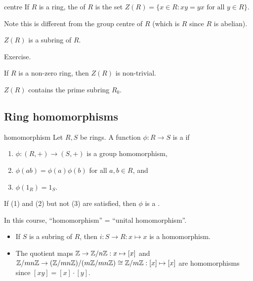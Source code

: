 \documentclass[12pt,letterpaper]{report}
\begin{document}
\begin{defn}{centre}{}
  If $R$ is a ring, the  of $R$ is the set
  $Z(R) = \{x \in R : xy = yx \text{ for all } y \in R\}$.
\end{defn}

Note this is different from the group centre of $R$ (which is $R$ since $R$ is abelian).

\begin{lem}{}{}
  $Z(R)$ is a subring of $R$.
\end{lem}

\begin{thmproof}
  Exercise.
\end{thmproof}

\begin{cor}{}{}
  If $R$ is a non-zero ring, then $Z(R)$ is non-trivial.
\end{cor}

\begin{thmproof}
  $Z(R)$ contains the prime subring $R_0$.
\end{thmproof}

\pagebreak
\subsection{Ring homomorphisms}

\begin{defn}{homomorphism}{}
  Let $R, S$ be rings.
  A function $\phi \colon R \to S$ is a  if
  \begin{enumerate}
    \item $\phi \colon (R, +) \to (S, +)$ is a group homomorphism,
    \item $\phi(ab) = \phi(a)\phi(b)$ for all $a, b \in R$, and
    \item $\phi(1_R) = 1_S$.
  \end{enumerate}
  If (1) and (2) but not (3) are satisfied, then $\phi$ is a .
\end{defn}

In this course, ``homomorphism'' = ``unital homomorphism''.

\begin{ex}
  \begin{itemize}
    \item If $S$ is a subring of $R$, then $i \colon S \to R : x \mapsto x$ is a homomorphism.
    \item The quotient maps $\mathbb{Z} \to \mathbb{Z}/{n}\mathbb{Z} : x \mapsto [x]$ and
      $\mathbb{Z}/{mn}\mathbb{Z} \to (\mathbb{Z}/{mn}\mathbb{Z})/(m\mathbb{Z}/mn\mathbb{Z}) \cong \mathbb{Z}/{m}\mathbb{Z} : [x] \mapsto [x]$ are homomorphisms
      since $[xy] = [x] \cdot [y]$.
  \end{itemize}
\end{ex}
\end{document}
